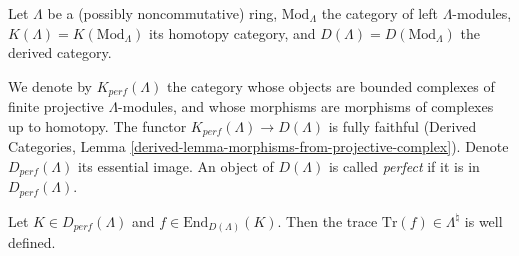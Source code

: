 \noindent
Let $\Lambda$ be a (possibly noncommutative) ring, $\text{Mod}_{\Lambda}$ the
category of left $\Lambda$-modules, $K(\Lambda) = K(\text{Mod}_\Lambda)$ its
homotopy category, and $D(\Lambda)= D(\text{Mod}_\Lambda)$ the derived
category.

\begin{definition}
\label{definition-perfect}
We denote by $K_{perf}(\Lambda)$ the category whose objects are bounded
complexes of finite projective $\Lambda$-modules, and whose morphisms are
morphisms of complexes up to homotopy. The functor $K_{perf}(\Lambda)\to
D(\Lambda)$ is fully faithful (Derived Categories, Lemma
\ref{derived-lemma-morphisms-from-projective-complex}).
Denote $D_{perf}(\Lambda)$ its essential image.
An object of $D(\Lambda)$ is called {\it perfect} if it is in
$D_{perf}(\Lambda)$.
\end{definition}

\begin{proposition}
\label{proposition-trace-well-defined}
Let $K\in D_{perf}(\Lambda)$ and $f\in \text{End}_{D(\Lambda)}(K)$. Then the
trace $\text{Tr}(f)\in \Lambda^\natural$ is well defined.
\end{proposition}

